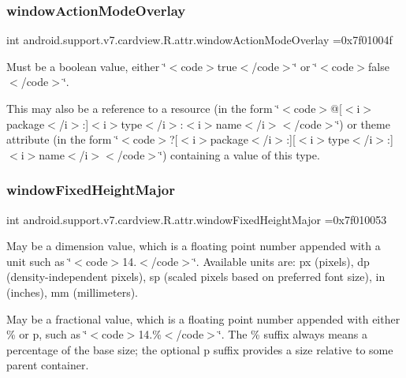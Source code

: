 \subsubsection{\texorpdfstring{window\+Action\+Mode\+Overlay}{windowActionModeOverlay}}
{\footnotesize\ttfamily int android.\+support.\+v7.\+cardview.\+R.\+attr.\+window\+Action\+Mode\+Overlay =0x7f01004f\hspace{0.3cm}{\ttfamily [static]}}

Must be a boolean value, either \char`\"{}$<$code$>$true$<$/code$>$\char`\"{} or \char`\"{}$<$code$>$false$<$/code$>$\char`\"{}. 

This may also be a reference to a resource (in the form \char`\"{}$<$code$>$@\mbox{[}$<$i$>$package$<$/i$>$\+:\mbox{]}$<$i$>$type$<$/i$>$\+:$<$i$>$name$<$/i$>$$<$/code$>$\char`\"{}) or theme attribute (in the form \char`\"{}$<$code$>$?\mbox{[}$<$i$>$package$<$/i$>$\+:\mbox{]}\mbox{[}$<$i$>$type$<$/i$>$\+:\mbox{]}$<$i$>$name$<$/i$>$$<$/code$>$\char`\"{}) containing a value of this type. \mbox{\label{classandroid_1_1support_1_1v7_1_1cardview_1_1R_1_1attr_a60358e25c5caa9936e1ff906a18e2212}} 
\subsubsection{\texorpdfstring{window\+Fixed\+Height\+Major}{windowFixedHeightMajor}}
{\footnotesize\ttfamily int android.\+support.\+v7.\+cardview.\+R.\+attr.\+window\+Fixed\+Height\+Major =0x7f010053\hspace{0.3cm}{\ttfamily [static]}}

May be a dimension value, which is a floating point number appended with a unit such as \char`\"{}$<$code$>$14.\+5sp$<$/code$>$\char`\"{}. Available units are\+: px (pixels), dp (density-\/independent pixels), sp (scaled pixels based on preferred font size), in (inches), mm (millimeters). 

May be a fractional value, which is a floating point number appended with either \% or p, such as \char`\"{}$<$code$>$14.\%$<$/code$>$\char`\"{}. The \% suffix always means a percentage of the base size; the optional p suffix provides a size relative to some parent container. 

